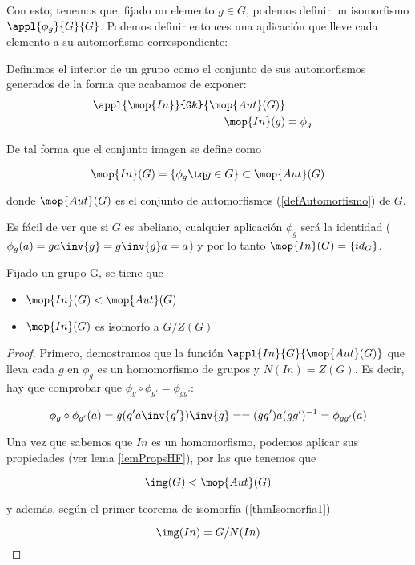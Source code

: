 \documentclass[nochap]{apuntes}
\begin{document}
Con esto, tenemos que, fijado un elemento $g\in G$, podemos definir un isomorfismo $\appl{\phi _g}{G}{G}$. Podemos definir entonces una aplicación que lleve cada elemento a su automorfismo correspondiente:  

\begin{defn} Definimos el interior de un grupo como el conjunto de sus automorfismos generados de la forma que acabamos de exponer:
\begin{align*}
 \appl{\mop{In}}{G&}{\mop{Aut}(G)} \\
 \mop{In}(g) &= \phi_g
\end{align*}
 
 De tal forma que el conjunto imagen se define como
 
\[ \mop{In}(G) = \{ \phi_g \tq g\in G\} \subset \mop{Aut}(G) \]

donde $\mop{Aut}(G)$ es el conjunto de automorfismos (\ref{defAutomorfismo}) de $G$.
\end{defn}

Es fácil de ver que si $G$ es abeliano, cualquier aplicación $\phi_g$ será la identidad ($\phi_g(a) = g a \inv{g} = g\inv{g}a = a$) y por lo tanto $\mop{In}(G) = \{ id_G \}$.

\begin{theorem}
Fijado un grupo G, se tiene que
\begin{itemize}
\item $\mop{In}(G) < \mop{Aut}(G)$
\item $\mop{In}(G)$ es isomorfo a $G/Z(G)$
\end{itemize}
\end{theorem}

\begin{proof}
Primero, demostramos que la función $\appl{In}{G}{\mop{Aut}(G)}$ que lleva cada $g$ en $\phi _g$ es un homomorfismo de grupos y $N(In) = Z(G)$. Es decir, hay que comprobar que $\phi_g\circ \phi_{g'} = \phi_{gg'}$:

\[ \phi _g \circ \phi _{g'} (a) = g(g'a\inv{g'})\inv{g} == (gg')a(gg')^{-1} = \phi_{gg'} (a) \]
 
 Una vez que sabemos que $In$ es un homomorfismo, podemos aplicar sus propiedades (ver lema \ref{lemPropsHF}), por las que tenemos que
 
 \[ \img(G) < \mop{Aut}(G) \]

y además, según el primer teorema de isomorfía (\ref{thmIsomorfia1}) 

\[ \img(In) = G/N(In) \]
\end{proof}
\end{document}
